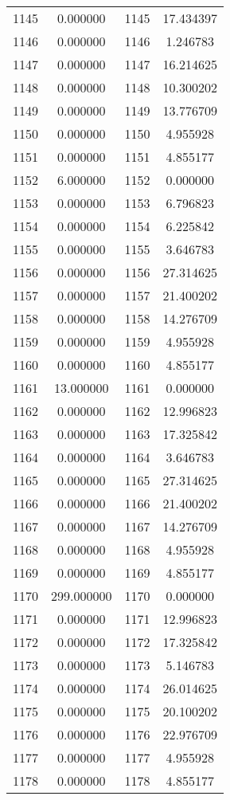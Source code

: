 \documentclass[12pt]{article}
\begin{document}
\begin{longtable}{@{}cccc@{}}
1145 & 0.000000 & 1145 & 17.434397 \\
1146 & 0.000000 & 1146 & 1.246783 \\
1147 & 0.000000 & 1147 & 16.214625 \\
1148 & 0.000000 & 1148 & 10.300202 \\
1149 & 0.000000 & 1149 & 13.776709 \\
1150 & 0.000000 & 1150 & 4.955928 \\
1151 & 0.000000 & 1151 & 4.855177 \\
1152 & 6.000000 & 1152 & 0.000000 \\
1153 & 0.000000 & 1153 & 6.796823 \\
1154 & 0.000000 & 1154 & 6.225842 \\
1155 & 0.000000 & 1155 & 3.646783 \\
1156 & 0.000000 & 1156 & 27.314625 \\
1157 & 0.000000 & 1157 & 21.400202 \\
1158 & 0.000000 & 1158 & 14.276709 \\
1159 & 0.000000 & 1159 & 4.955928 \\
1160 & 0.000000 & 1160 & 4.855177 \\
1161 & 13.000000 & 1161 & 0.000000 \\
1162 & 0.000000 & 1162 & 12.996823 \\
1163 & 0.000000 & 1163 & 17.325842 \\
1164 & 0.000000 & 1164 & 3.646783 \\
1165 & 0.000000 & 1165 & 27.314625 \\
1166 & 0.000000 & 1166 & 21.400202 \\
1167 & 0.000000 & 1167 & 14.276709 \\
1168 & 0.000000 & 1168 & 4.955928 \\
1169 & 0.000000 & 1169 & 4.855177 \\
1170 & 299.000000 & 1170 & 0.000000 \\
1171 & 0.000000 & 1171 & 12.996823 \\
1172 & 0.000000 & 1172 & 17.325842 \\
1173 & 0.000000 & 1173 & 5.146783 \\
1174 & 0.000000 & 1174 & 26.014625 \\
1175 & 0.000000 & 1175 & 20.100202 \\
1176 & 0.000000 & 1176 & 22.976709 \\
1177 & 0.000000 & 1177 & 4.955928 \\
1178 & 0.000000 & 1178 & 4.855177 \\

\end{longtable}
\end{document}
